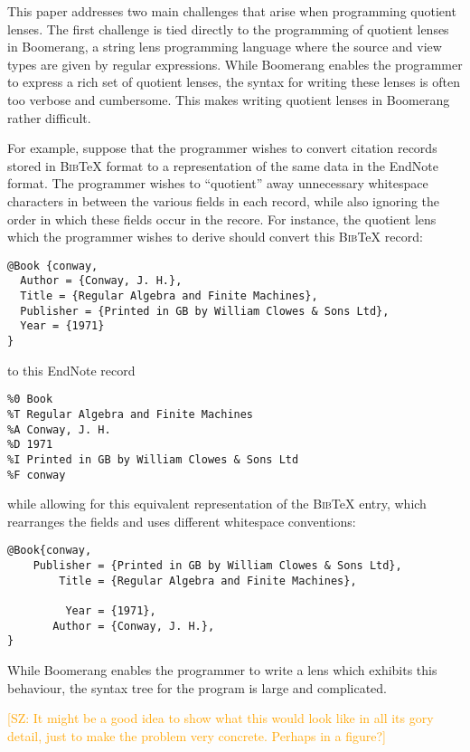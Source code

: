 \documentclass{svproc}
\newcommand{\FINISH}[3]{\ifdraft\textcolor{#1}{[#2: #3]}\fi}
\newcommand{\saz}[1]{\FINISH{orange}{SZ}{#1}}
\begin{document}
This paper addresses two main challenges that arise when programming quotient
lenses. The first challenge is tied directly to the programming of quotient
lenses in Boomerang, a string lens programming language where the source and
view types are given by regular expressions. While Boomerang enables the
programmer to express a rich set of quotient lenses, the syntax for writing
these lenses is often too verbose and cumbersome. This makes writing quotient
lenses in Boomerang rather difficult.

For example, suppose that the programmer wishes to convert citation records
stored in \textsc{Bib}\TeX{} format to a representation of the same data in the
EndNote format. The programmer wishes to ``quotient'' away unnecessary
whitespace characters in between the various fields in each record, while also
ignoring the order in which these fields occur in the recore. For instance, the
quotient lens which the programmer wishes to derive should convert this
\textsc{Bib}\TeX{} record:

\begin{verbatim}
@Book {conway,
  Author = {Conway, J. H.},
  Title = {Regular Algebra and Finite Machines},
  Publisher = {Printed in GB by William Clowes & Sons Ltd},
  Year = {1971}
}
\end{verbatim}

to this EndNote record

\begin{verbatim}
%0 Book
%T Regular Algebra and Finite Machines
%A Conway, J. H.
%D 1971
%I Printed in GB by William Clowes & Sons Ltd
%F conway
\end{verbatim}

\noindent while allowing for this equivalent representation of the \textsc{Bib}\TeX{}
entry, which rearranges the fields and uses different whitespace conventions:

\begin{verbatim}
@Book{conway, 
    Publisher = {Printed in GB by William Clowes & Sons Ltd},
        Title = {Regular Algebra and Finite Machines},

         Year = {1971},
       Author = {Conway, J. H.},
}
\end{verbatim}

While Boomerang enables the programmer to write a lens which exhibits this
behaviour, the syntax tree for the program is large and complicated.  

\saz{It might be a good idea to show what this would look like in all its gory
detail, just to make the problem very concrete. Perhaps in a figure?}
  
\end{document}
